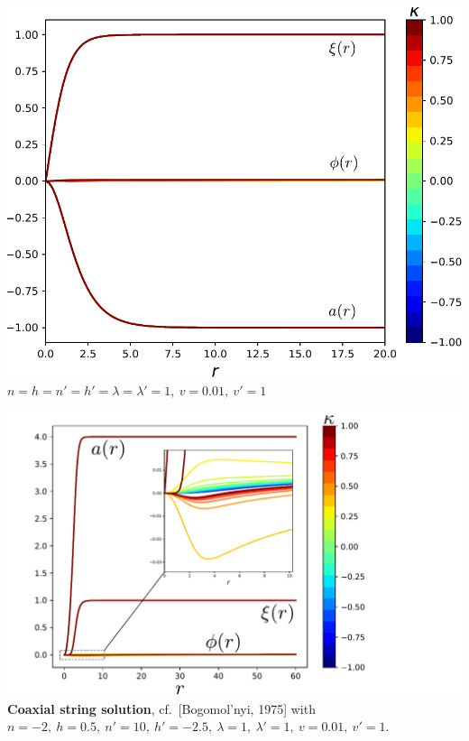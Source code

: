 \documentclass[14pt]{beamer}
\begin{document}
\begin{frame}

\includegraphics[scale=0.6]{chapters/n1h1np1hp1l1lp1v001vp1edited.pdf}%
$n = h = n' = h'  = \lambda=\lambda' = 1,\ v =0.01,\ v' = 1 $
\end{frame}

\begin{frame}

\includegraphics[scale=0.55]{chapters/n-2h05np10hp-25l1lp1v001vp1combined.pdf} %
\textbf{Coaxial string solution}, cf.\ [Bogomol'nyi, 1975] with $n = -2,\ h =0.5,\ n' = 10,\ h' = -2.5,\  \lambda=1,\ \lambda' = 1,\ v =0.01,\ v' = 1$.
\end{frame}
\end{document}
